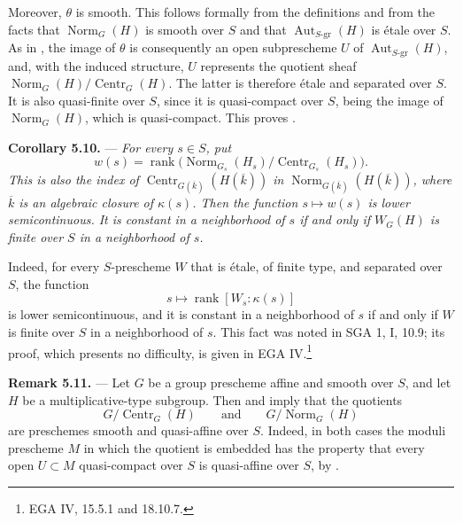 Moreover, \(\theta\) is smooth.  This follows formally from the
definitions and from the facts that \(\operatorname{Norm}_G(H)\) is
smooth over \(S\) and that
\(\operatorname{Aut}_{S\text{-}\mathrm{gr}}(H)\) is étale over
\(S\).  As in , the image of \(\theta\) is consequently an open
subprescheme \(U\) of
\(\operatorname{Aut}_{S\text{-}\mathrm{gr}}(H)\), and, with the
induced structure, \(U\) represents the quotient sheaf
\(\operatorname{Norm}_G(H)/\operatorname{Centr}_G(H)\).  The latter
is therefore étale and separated over \(S\).  It is also quasi-finite
over \(S\), since it is quasi-compact over \(S\), being the image of
\(\operatorname{Norm}_G(H)\), which is quasi-compact.  This proves
.

\medskip
\noindent{}\textbf{Corollary 5.10.} ---
\textit{For every \(s\in S\), put}
\[
  w(s)=
  \operatorname{rank}
  \bigl(
    \operatorname{Norm}_{G_s}(H_s)/
    \operatorname{Centr}_{G_s}(H_s)
  \bigr).
\]
\textit{This is also the index of
\(\operatorname{Centr}_{G(\overline{k})}(H(\overline{k}))\) in
\(\operatorname{Norm}_{G(\overline{k})}(H(\overline{k}))\), where
\(\overline{k}\) is an algebraic closure of \(\kappa(s)\).  Then the
function \(s\mapsto w(s)\) is lower semicontinuous.  It is constant
in a neighborhood of \(s\) if and only if \(W_G(H)\) is finite over
\(S\) in a neighborhood of \(s\).}

Indeed, for every \(S\)-prescheme \(W\) that is étale, of finite
type, and separated over \(S\), the function
\[
  s\longmapsto
  \operatorname{rank}[W_s:\kappa(s)]
\]
is lower semicontinuous, and it is constant in a neighborhood of
\(s\) if and only if \(W\) is finite over \(S\) in a neighborhood of
\(s\).  This fact was noted in SGA 1, I, 10.9; its proof, which
presents no difficulty, is given in EGA IV.\footnote{EGA IV, 15.5.1
and 18.10.7.}

\medskip
\noindent{}\textbf{Remark 5.11.}%
 ---
Let \(G\) be a group prescheme affine and smooth over \(S\), and let
\(H\) be a multiplicative-type subgroup.  Then  and  imply
that the quotients
\[
  G/\operatorname{Centr}_G(H)
  \qquad\text{and}\qquad
  G/\operatorname{Norm}_G(H)
\]
are preschemes smooth and quasi-affine over \(S\).  Indeed, in both
cases the moduli prescheme \(M\) in which the quotient is embedded
has the property that every open \(U\subset M\) quasi-compact over
\(S\) is quasi-affine over \(S\), by .

